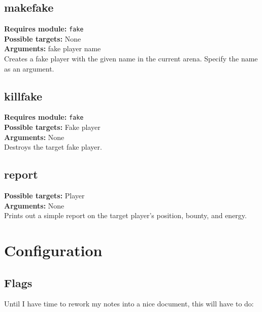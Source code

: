 \documentclass{article}
\newcommand{\requiremod}[1]{\noindent\textbf{Requires module:} \texttt{#1}\\}
\newcommand{\targets}[1]{\noindent\textbf{Possible targets:} #1\\}
\newcommand{\args}[1]{\noindent\textbf{Arguments:} #1\\}
\begin{document}
\subsection{makefake}  %
\requiremod{fake}
\targets{None}
\args{fake player name}
Creates a fake player with the given name in the current arena. Specify
the name as an argument.

\subsection{killfake}  %
\requiremod{fake}
\targets{Fake player}
\args{None}
Destroys the target fake player.

\subsection{report}  %
\targets{Player}
\args{None}
Prints out a simple report on the target player's position, bounty, and
energy.


\section{Configuration}

\subsection{Flags}

Until I have time to rework my notes into a nice document, this will
have to do:
\end{document}
